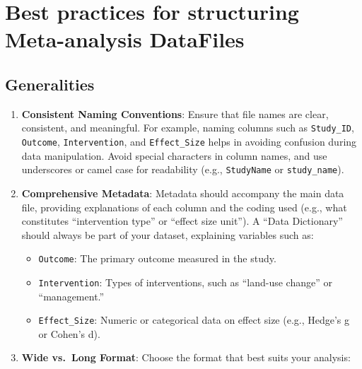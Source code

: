 \documentclass[
]{book}
\providecommand{\tightlist}{%
  \setlength{\itemsep}{0pt}\setlength{\parskip}{0pt}}
\begin{document}
\section{Best practices for structuring Meta-analysis DataFiles}\label{best-practices-for-structuring-meta-analysis-datafiles}

\subsection{Generalities}\label{generalities}

\begin{enumerate}
\def\labelenumi{\arabic{enumi}.}
\item
  \textbf{Consistent Naming Conventions}: Ensure that file names are clear, consistent, and meaningful.
  For example, naming columns such as \texttt{Study\_ID}, \texttt{Outcome}, \texttt{Intervention}, and \texttt{Effect\_Size} helps in avoiding confusion during data manipulation.
  Avoid special characters in column names, and use underscores or camel case for readability (e.g., \texttt{StudyName} or \texttt{study\_name}).
\item
  \textbf{Comprehensive Metadata}: Metadata should accompany the main data file, providing explanations of each column and the coding used (e.g., what constitutes ``intervention type'' or ``effect size unit'').
  A ``Data Dictionary'' should always be part of your dataset, explaining variables such as:

  \begin{itemize}
  \tightlist
  \item
    \texttt{Outcome}: The primary outcome measured in the study.
  \item
    \texttt{Intervention}: Types of interventions, such as ``land-use change'' or ``management.''
  \item
    \texttt{Effect\_Size}: Numeric or categorical data on effect size (e.g., Hedge's g or Cohen's d).
  \end{itemize}
\item
  \textbf{Wide vs.~Long Format}: Choose the format that best suits your analysis:
\end{enumerate}
\end{document}
